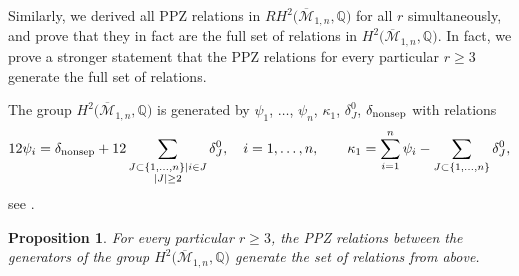 \documentclass[pdftex]{sigma}
\def\oM{\overline{\mathcal{M}}}
\numberwithin{equation}{section}
\newtheorem{Proposition}[Theorem]{Proposition}
 { \theoremstyle{definition}
\newtheorem{Definition}[Theorem]{Definition}
\newtheorem{Note}[Theorem]{Note}
\newtheorem{Example}[Theorem]{Example}
\newtheorem{Remark}[Theorem]{Remark} }
\begin{document}
Similarly, we derived all PPZ relations in $RH^2\big(\oM_{1,n},\mathbb{Q}\big)$ for all $r$ simultaneously, and prove that they in fact are the full set of relations in $H^2\big(\oM_{1,n},\mathbb{Q}\big)$. In fact, we prove a stronger statement that the PPZ relations for every particular $r\geq3$ generate the full set of relations.

The group $H^2\big(\oM_{1,n},\mathbb{Q}\big)$ is generated by
$\psi_1$, $\dots$, $\psi_n$, $\kappa_1$, $\delta^{0}_{J}$, $\delta_{\rm nonsep}$ with relations
\begin{gather}
12\psi_i = \delta_{\rm nonsep} + 12\sum_{\substack{J\subset \{1,\dots,n\}|i\in J \\ |J|\geq 2}} \delta^{0}_{J}, \quad i=1,\dots,n,\qquad
 \kappa_1 = \sum^{n}_{i=1}\psi_i - \sum_{J\subset \{1,\dots,n\}}\delta^{0}_{J},\label{genus1}
\end{gather}
see \cite[Theorem 2.2]{Cor}.

\begin{Proposition}
For every particular $r\geq3$, the PPZ relations between the generators of the group $H^2\big(\oM_{1,n},\mathbb{Q}\big)$ generate the set of relations from above.
\end{Proposition}
\end{document}
